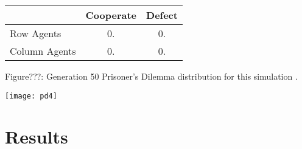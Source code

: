 \documentclass{article}
\begin{document}
\begin{center}
\begin{tabular}{|l|c|c|}
\hline
& Cooperate & Defect \\ 
\hline
Row Agents & 0. & 0.\\
\hline
Column Agents & 0. & 0.\\
\hline
\end{tabular}
\end{center}
\begin{center}
Figure???: Generation 50 Prisoner’s Dilemma distribution for this simulation .
\end{center}

\begin{center}
	\texttt{[image: pd4]}
\end{center}



\section{Results}

\newpage


\end{document}

